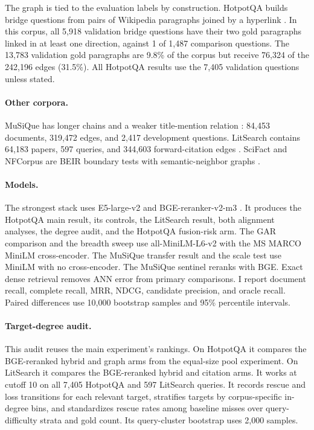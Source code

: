 \documentclass[10pt,twocolumn]{article}
\begin{document}
The graph is tied to the evaluation labels by construction. HotpotQA builds
bridge questions from pairs of Wikipedia paragraphs joined by a hyperlink
\citep{yang2018hotpotqa}. In this corpus, all 5,918 validation bridge
questions have their two gold paragraphs linked in at least one direction,
against 1 of 1,487 comparison questions. The 13,783 validation gold paragraphs
are 9.8\% of the corpus but receive 76,324 of the 242,196 edges (31.5\%). All
HotpotQA results use the 7,405 validation questions unless stated.

\paragraph{Other corpora.}
MuSiQue has longer chains and a weaker title-mention relation
\citep{trivedi2022musique}: 84,453 documents, 319,472 edges, and 2,417
development questions. LitSearch contains 64,183 papers, 597 queries, and
344,603 forward-citation edges \citep{ajith2024litsearch}. SciFact and NFCorpus
are BEIR boundary tests with semantic-neighbor graphs \citep{thakur2021beir}.

\paragraph{Models.}
The strongest stack uses E5-large-v2 \citep{wang2022e5} and
BGE-reranker-v2-m3 \citep{chen2024bge}. It produces the HotpotQA main result,
its controls, the LitSearch result, both alignment analyses, the degree audit,
and the HotpotQA fusion-risk arm. The GAR comparison and the breadth sweep use all-MiniLM-L6-v2 with the
MS MARCO MiniLM cross-encoder. The MuSiQue transfer result and the scale test use
MiniLM with no cross-encoder. The MuSiQue sentinel reranks with BGE. Exact dense retrieval removes ANN error from primary
comparisons. I report document recall, complete recall, MRR, NDCG, candidate
precision, and oracle recall. Paired differences use 10,000 bootstrap samples
and 95\% percentile intervals.

\paragraph{Target-degree audit.}
This audit reuses the main experiment's rankings. On HotpotQA it compares the
BGE-reranked hybrid and graph arms from the equal-size pool experiment. On
LitSearch it compares the BGE-reranked hybrid and citation arms. It works at
cutoff 10 on all 7,405 HotpotQA and 597 LitSearch queries. It records rescue
and loss transitions for each relevant target, stratifies targets by
corpus-specific in-degree bins, and standardizes rescue rates among baseline
misses over query-difficulty strata and gold count. Its query-cluster
bootstrap uses 2,000 samples.
\end{document}
